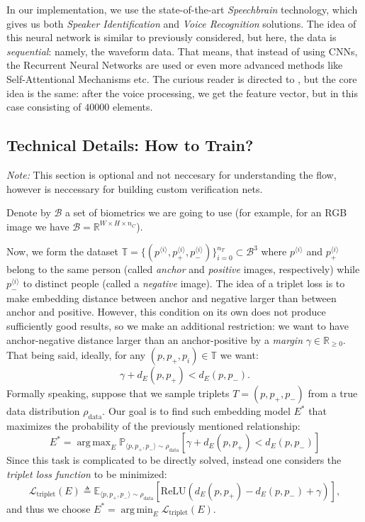 \documentclass[a4, 14pt]{extarticle}
\DeclareMathOperator*{\argmax}{arg\,max}
\DeclareMathOperator*{\argmin}{arg\,min}
\begin{document}
In our implementation, we use the state-of-the-art \textit{Speechbrain}\cite{ravanelli2021speechbrain} technology, which gives us both \textit{Speaker Identification} and \textit{Voice Recognition} solutions. The idea of this neural network is similar to previously considered, but here, the data is \textit{sequential}: namely, the waveform data. That means, that instead of using CNNs, the Recurrent Neural Networks are used or even more advanced methods like Self-Attentional Mechanisms etc. The curious reader is directed to \cite{bai2021speaker}, but the core idea is the same: after the voice processing, we get the feature vector, but in this case consisting of $40000$ elements. 

\subsection{Technical Details: How to Train?}\label{ai:details}
\textit{Note:} This section is optional and not neccesary for understanding the flow, however is neccessary for building custom verification nets.

Denote by $\mathcal{B}$ a set of biometrics we are going to use (for example, for an RGB image we have $\mathcal{B} = \mathbb{R}^{W \times H \times n_C}$). 

Now, we form the dataset $\mathbb{T} = \{(p^{\langle i \rangle},p^{\langle i \rangle}_+,p^{\langle i \rangle}_-)\}_{i=0}^{n_T} \subset \mathcal{B}^3$ where $p^{\langle i \rangle}$ and $p^{\langle i \rangle}_+$ belong to the same person (called \textit{anchor} and \textit{positive} images, respectively) while $p^{\langle i \rangle}_-$ to distinct people (called a \textit{negative} image). The idea of a triplet loss is to make embedding distance between anchor and negative larger than between anchor and positive. However, this condition on its own does not produce sufficiently good results, so we make an additional restriction: we want to have anchor-negative distance larger than an anchor-positive by a \textit{margin} $\gamma \in \mathbb{R}_{\geq 0}$. That being said, ideally, for any $(p,p_+,p_i) \in \mathbb{T}$ we want:
\begin{equation}
\gamma + d_E(p,p_+) < d_E(p,p_-).
\end{equation}
Formally speaking, suppose that we sample triplets $T=(p,p_+,p_-)$ from a true data distribution $\rho_{\text{data}}$. Our goal is to find such embedding model $E^*$ that maximizes the probability of the previously mentioned relationship:
\begin{equation}
    E^* = \argmax_{E}\mathbb{P}_{\langle p,p_+,p_- \rangle \sim \rho_{\text{data}}}\left[\gamma+d_{E}(p,p_+) < d_{E}(p,p_-) \right]
\end{equation}
Since this task is complicated to be directly solved, instead one considers the \textit{triplet loss function} to be minimized:
\begin{equation}\label{eq:triplet_loss}
\mathcal{L}_{\text{triplet}}(E)\triangleq \mathbb{E}_{\langle p,p_+,p_- \rangle \sim \rho_{\text{data}}}\left[\text{ReLU}\left(d_{E}(p,p_+) - d_{E}(p,p_-) + \gamma\right)\right],
\end{equation}
and thus we choose $E^*=\argmin_E \mathcal{L}_{\text{triplet}}(E)$.

\small


\end{document}
